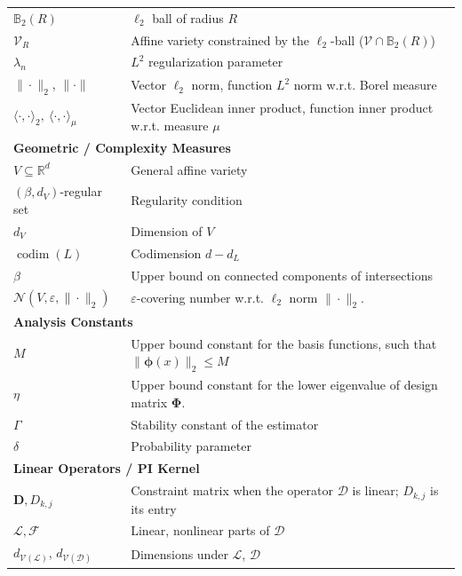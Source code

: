 \documentclass{article}
\def\mD{{\bm{D}}}
\def\emD{{D}}
\theoremstyle{plain}
\theoremstyle{definition}
\theoremstyle{remark}
\begin{document}
\begin{table}[!htbp]
\begin{tabular}{ll}
$\mathbb{B}_2(R)$ & $\ell_2$ ball of radius $R$ \\
$\mathcal{V}_R$ & Affine variety constrained by the $\ell_2$-ball ($\mathcal{V} \cap \mathbb{B}_2(R)$) \\
$\lambda_n$ & $L^2$ regularization parameter \\
$\|\cdot\|_2$, $\|\cdot\|$ & Vector $\ell_2$ norm, function $L^2$ norm w.r.t. Borel measure \\
$\langle \cdot, \cdot \rangle_{2},\ \langle \cdot, \cdot \rangle_{\mu}$ & Vector Euclidean inner product, function inner product w.r.t. measure $\mu$ \\
\midrule
\multicolumn{2}{l}{\textbf{\vspace{0.02in} Geometric / Complexity Measures}} \\
$V \subseteq \mathbb{R}^d$ & General affine variety \\
$(\beta, d_V)$-regular set & Regularity condition \\
$d_V$ & Dimension of $V$ \\
$\operatorname{codim}(L)$ & Codimension $d - d_L$ \\
$\beta$ & Upper bound on connected components of intersections \\
$\mathcal{N}(V, \varepsilon, \|\cdot\|_2)$ & $\varepsilon$-covering number w.r.t. $\ell_2$ norm $\|\cdot\|_2$.\\
\midrule
\multicolumn{2}{l}{\vspace{0.02in}\textbf{Analysis Constants}} \\
$M$ & Upper bound constant for the basis functions, such that $\|\boldsymbol{\phi}(x)\|_2 \leq M$ \\
$\eta$ & Upper bound constant for the lower eigenvalue of design matrix $\mathbf{\Phi}$.  \\
$\Gamma$ & Stability constant of the estimator \\
$\delta$ & Probability parameter \\
\midrule
\multicolumn{2}{l}{\vspace{0.02in}\textbf{Linear Operators / PI Kernel}} \\
$\mD, \emD_{k,j}$ & Constraint matrix when the operator $\mathscr{D}$ is linear; $\emD_{k,j}$ is its entry \\
$\mathscr{L}, \mathscr{F}$ & Linear, nonlinear parts of $\mathscr{D}$ \\
$d_{\mathcal{V}(\mathscr{L})}$, $d_{\mathcal{V}(\mathscr{D})}$ & Dimensions under $\mathscr{L}$, $\mathscr{D}$ \\

\end{tabular}
\end{table}
\end{document}
